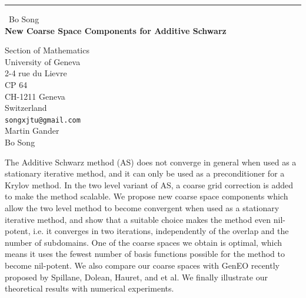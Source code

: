 \documentclass{report}
\begin{document}
\begin{center}
\rule{6in}{1pt} \
{\large Bo Song \\
{\bf New Coarse Space Components for Additive Schwarz}}

Section of Mathematics \\ University of Geneva \\ 2-4 rue du Lievre \\ CP 64 \\ CH-1211 Geneva \\ Switzerland
\\
{\tt songxjtu@gmail.com}\\
Martin Gander\\
Bo Song\end{center}

The Additive Schwarz method (AS) does not converge in general when used
as a stationary iterative method, and it can only be used as a
preconditioner for a Krylov method. In the two level variant of AS, a
coarse grid correction is added to make the method scalable. We propose
new coarse space components which allow the two level method to become
convergent when used as a stationary iterative method, and show that a
suitable choice makes the method even nil-potent, i.e. it converges in
two iterations, independently of the overlap and the number of
subdomains. One of the coarse spaces we obtain is optimal, which means it
uses the fewest number of basis functions possible for the method to
become nil-potent. We also compare our coarse spaces with GenEO recently
proposed by Spillane, Dolean, Hauret, and et al. We finally illustrate
our theoretical results with numerical experiments.
\end{document}
